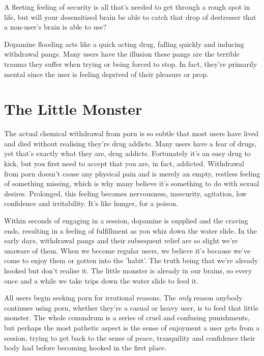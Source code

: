 \documentclass[
]{book}
\begin{document}
A fleeting feeling of security is all that's needed to get through a rough spot in life, but will your desensitised brain be able to catch that drop of destresser that a non-user's brain is able to use?

Dopamine flooding acts like a quick acting drug, falling quickly and inducing withdrawal pangs. Many users have the illusion these pangs are the terrible trauma they suffer when trying or being forced to stop. In fact, they're primarily mental since the user is feeling deprived of their pleasure or prop.

\hypertarget{the-little-monster}{%
\section{The Little Monster}\label{the-little-monster}}

The actual chemical withdrawal from porn is so subtle that most users have lived and died without realising they're drug addicts. Many users have a fear of drugs, yet that's exactly what they are, drug addicts. Fortunately it's an easy drug to kick, but you first need to accept that you are, in fact, addicted. Withdrawal from porn doesn't cause any physical pain and is merely an empty, restless feeling of something missing, which is why many believe it's something to do with sexual desires. Prolonged, this feeling becomes nervousness, insecurity, agitation, low confidence and irritability. It's like hunger, for a poison.

Within seconds of engaging in a session, dopamine is supplied and the craving ends, resulting in a feeling of fulfillment as you whiz down the water slide. In the early days, withdrawal pangs and their subsequent relief are so slight we're unaware of them. When we become regular users, we believe it's because we've come to enjoy them or gotten into the 'habit'. The truth being that we're already hooked but don't realise it. The little monster is already in our brains, so every once and a while we take trips down the water slide to feed it.

All users begin seeking porn for irrational reasons. The \emph{only} reason anybody continues using porn, whether they're a casual or heavy user, is to feed that little monster. The whole conundrum is a series of cruel and confusing punishments, but perhaps the most pathetic aspect is the sense of enjoyment a user gets from a session, trying to get back to the sense of peace, tranquility and confidence their body had before becoming hooked in the first place.
\end{document}
